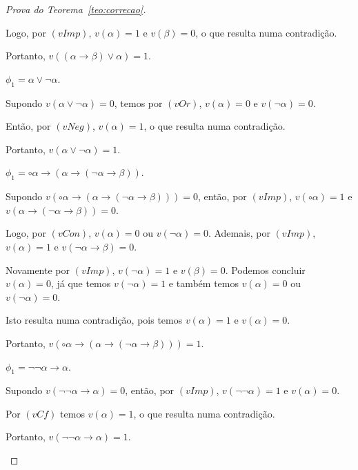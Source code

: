 \begin{proof}[Prova do Teorema~\ref{teo:correcao}]
\begin{provaporcasos}
\begin{provaporsubcasos}
                    Logo, por $(vImp)$, $v(\alpha) = 1$  e $v(\beta) = 0$, o que resulta numa contradição. 
                    
                    Portanto, $v((\alpha \to \beta) \lor \alpha) = 1$.

                \subcasodeprova{} $\phi_{1} = \alpha \lor \neg \alpha$. 
                
                    Supondo $v(\alpha \lor \neg \alpha) = 0$, temos por $(vOr)$, $v(\alpha) = 0$ e $v(\neg \alpha) = 0$. 
                    
                    Então, por $(vNeg)$, $v(\alpha) = 1$, o que resulta numa contradição. 
                    
                    Portanto, $v(\alpha \lor \neg \alpha) = 1$.

                \subcasodeprova{} $\phi_{1} = \circ \alpha \to (\alpha \to (\neg \alpha \to \beta))$. 
                
                    Supondo $v(\circ \alpha \to (\alpha \to (\neg \alpha \to \beta))) = 0$, então, por $(vImp)$, $v(\circ \alpha) = 1$ e $v(\alpha \to (\neg \alpha \to \beta)) = 0$. 
                    
                    Logo, por $(vCon)$, $v(\alpha) = 0$ ou $v(\neg \alpha) = 0$. Ademais, por $(vImp)$, $v(\alpha) = 1$ e $v(\neg \alpha \to \beta) = 0$. 
                    
                    Novamente por $(vImp)$, $v(\neg \alpha) = 1$ e $v(\beta) = 0$. Podemos concluir $v(\alpha) = 0$, já que temos $v(\neg \alpha) = 1$ e também temos $v(\alpha) = 0$ ou $v(\neg \alpha) = 0$. 
                    
                    Isto resulta numa contradição, pois temos $v(\alpha) = 1$ e $v(\alpha) = 0$. 
                    
                    Portanto, $v(\circ \alpha \to (\alpha \to (\neg \alpha \to \beta))) = 1$.

                \subcasodeprova{} $\phi_{1} = \neg \neg \alpha \to \alpha$. 
                    
                    Supondo $v(\neg \neg \alpha \to \alpha) = 0$, então, por $(vImp)$, $v(\neg \neg \alpha) = 1$ e $v(\alpha) = 0$. 
                    
                    Por $(vCf)$ temos $v(\alpha) = 1$, o que resulta numa contradição. 
                    
                    Portanto, $v(\neg \neg \alpha \to \alpha) = 1$.


\end{provaporsubcasos}
\end{provaporcasos}
\end{proof}
